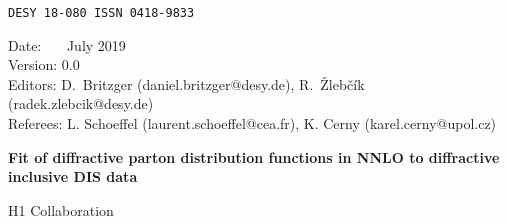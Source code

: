 \documentclass[12pt]{article}
\begin{document}
\newcommand{\mt} {\ensuremath{m_t}}
\newcommand{\mW} {\ensuremath{m_W}}
\newcommand{\mWprop} {\ensuremath{m^{\rm prop}_W}}
\newcommand{\mWGfW} {\ensuremath{m^{(\gf,\mW)}_W}}
\newcommand{\mZ} {\ensuremath{m_Z}}
\newcommand{\mH} {\ensuremath{m_H}}


\def\Journal#1#2#3#4{{#1}~{\bf #2} (#3) #4}
%
\def\NPB{Nucl. Phys.~}
\def\PRL{Phys. Rev. Lett.~}
\def\EPJC{Eur. Phys. J.~}
\def\PLB{Phys. Lett.~}
\def\NIM{Nucl. Instrum. Meth.~}
\def\PRD{Phys. Rev.~}
\def\JHEP{JHEP~}
\def\PROC{Conf. Proc.~}
\def\CPC{Comp. Phys. Commun.~}


\begin{titlepage}

\noindent
\begin{flushleft}
{\tt DESY 18-080    \hfill    ISSN 0418-9833} \\
\end{flushleft}

\noindent
Date:      \ \ \ July 2019      \\
Version:   0.0 \\
Editors:   D.\ Britzger (daniel.britzger@desy.de), R.~\v{Z}leb\v{c}\'{i}k (radek.zlebcik@desy.de) \\
Referees:  L. Schoeffel (laurent.schoeffel@cea.fr), K. Cerny (karel.cerny@upol.cz)
\noindent

\vspace{2cm}
\begin{center}
\begin{Large}


{\bf Fit of diffractive parton distribution functions in NNLO to diffractive inclusive DIS data}

\vspace{2cm}

H1 Collaboration

\end{Large}
\end{center}

\vspace{2cm}


\end{titlepage}
\end{document}
